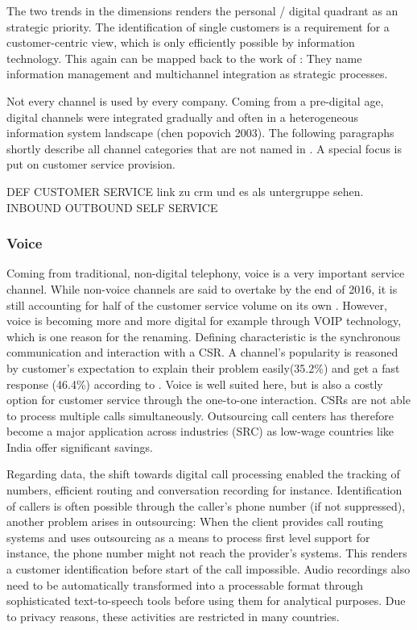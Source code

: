 		The two trends in the dimensions renders the personal / digital quadrant as an strategic priority.
		The identification of single customers is a requirement for a customer-centric view, which is only efficiently possible by information technology.  
		This again can be mapped back to the work of \citeauthor{paynefrow2005}: They name information management and multichannel integration as strategic processes. 
		
		Not every channel is used by every company. Coming from a pre-digital age, digital channels were integrated gradually and often in a heterogeneous information system landscape (chen popovich 2003). The following paragraphs shortly describe all channel categories that are not named  in  \citeauthor{paynefrow2005}. A special focus is put on customer service provision. 
		
		DEF CUSTOMER SERVICE link zu crm und es als untergruppe sehen. 
		INBOUND
		OUTBOUND
		SELF SERVICE
		
		
		\subsubsection{Voice}
		
		Coming from traditional, non-digital telephony, voice is a very important service channel. While non-voice channels are said to overtake by the end of 2016, it is still accounting for half of the customer service volume on its own \cite{dimensiondata2016}. However, voice is becoming more and more digital for example through \acrfull{VOIP} technology, which is one reason for the renaming. Defining characteristic is the synchronous communication and interaction with a \acrfull{CSR}. A channel's popularity is reasoned by customer's expectation to explain their problem easily(35.2\%) and get a fast response (46.4\%) according to \cite{ocm2015}. Voice is well suited here, but is also a costly option for customer service through the one-to-one interaction. \acrshort{CSR}s are not able to process multiple calls simultaneously. Outsourcing call centers has therefore become a major application across industries (SRC) as low-wage countries like India offer significant savings. 
		
		Regarding data, the shift towards digital call processing enabled the tracking of numbers, efficient routing and conversation recording for instance. Identification of callers is often possible through the caller's phone number (if not suppressed), another problem arises in outsourcing: When the client provides call routing systems and uses outsourcing as a means to process first level support for instance, the phone number might not reach the provider's systems. This renders a customer identification before start of the call impossible. Audio recordings also need to be automatically transformed into a processable format through sophisticated text-to-speech tools before using them for analytical purposes. Due to privacy reasons, these activities are restricted in many countries. 
		
